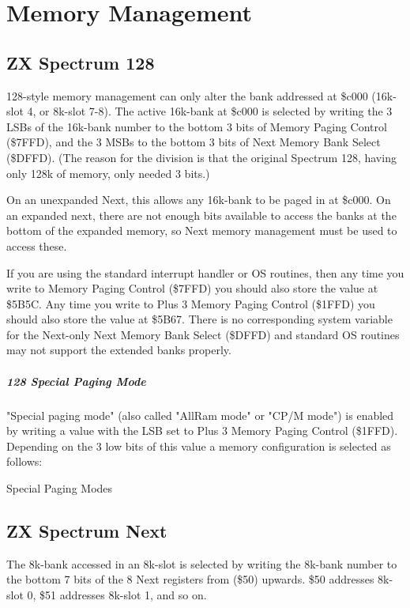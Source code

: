 \chapter{Memory Management}
\section{ZX Spectrum 128}
128-style memory management can only alter the bank addressed at
\$c000 (16k-slot 4, or 8k-slot 7-8). The active 16k-bank at \$c000 is
selected by writing the 3 LSBs of the 16k-bank number to the bottom 3
bits of Memory Paging Control (\$7FFD), and the 3 MSBs to the bottom 3
bits of Next Memory Bank Select (\$DFFD). (The reason for the division
is that the original Spectrum 128, having only 128k of memory, only
needed 3 bits.)

On an unexpanded Next, this allows any 16k-bank to be paged in at
\$c000. On an expanded next, there are not enough bits available to
access the banks at the bottom of the expanded memory, so Next memory
management must be used to access these.

If you are using the standard interrupt handler or OS routines, then
any time you write to Memory Paging Control (\$7FFD) you should also
store the value at \$5B5C. Any time you write to Plus 3 Memory Paging
Control (\$1FFD) you should also store the value at \$5B67. There is
no corresponding system variable for the Next-only Next Memory Bank
Select (\$DFFD) and standard OS routines may not support the extended
banks properly.

\paragraph{128 Special Paging Mode}

"Special paging mode" (also called "AllRam mode" or "CP/M mode") is
enabled by writing a value with the LSB set to Plus 3 Memory Paging
Control (\$1FFD). Depending on the 3 low bits of this value a memory
configuration is selected as follows:

\begin{table}[h]\centering
  \caption{Special Paging Modes}
\end{table}

\section{ZX Spectrum Next}
The 8k-bank accessed in an 8k-slot is selected by writing the 8k-bank
number to the bottom 7 bits of the 8 Next registers from (\$50)
upwards. \$50 addresses 8k-slot 0, \$51 addresses 8k-slot 1, and so
on.

